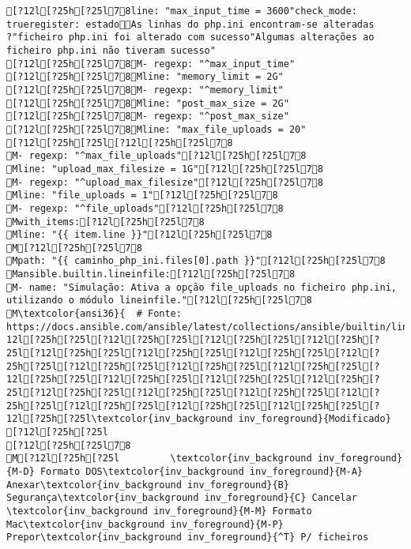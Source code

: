 \documentclass{scrartcl}
\begin{document}
\begin{Verbatim}
[?12l[?25h[?25l78line: "max_input_time = 3600"check_mode: trueregister: estadoAs linhas do php.ini encontram-se alteradas ?"ficheiro php.ini foi alterado com sucesso"Algumas alterações ao ficheiro php.ini não tiveram sucesso"
[?12l[?25h[?25l78M- regexp: "^max_input_time"
[?12l[?25h[?25l78Mline: "memory_limit = 2G"
[?12l[?25h[?25l78M- regexp: "^memory_limit"
[?12l[?25h[?25l78Mline: "post_max_size = 2G"
[?12l[?25h[?25l78M- regexp: "^post_max_size"
[?12l[?25h[?25l78Mline: "max_file_uploads = 20"
[?12l[?25h[?25l[?12l[?25h[?25l78
M- regexp: "^max_file_uploads"[?12l[?25h[?25l78
Mline: "upload_max_filesize = 1G"[?12l[?25h[?25l78
M- regexp: "^upload_max_filesize"[?12l[?25h[?25l78
Mline: "file_uploads = 1"[?12l[?25h[?25l78
M- regexp: "^file_uploads"[?12l[?25h[?25l78
Mwith_items:[?12l[?25h[?25l78
Mline: "{{ item.line }}"[?12l[?25h[?25l78
M[?12l[?25h[?25l78
Mpath: "{{ caminho_php_ini.files[0].path }}"[?12l[?25h[?25l78
Mansible.builtin.lineinfile:[?12l[?25h[?25l78
M- name: "Simulação: Ativa a opção file_uploads no ficheiro php.ini, utilizando o módulo lineinfile."[?12l[?25h[?25l78
M\textcolor{ansi36}{  # Fonte: https://docs.ansible.com/ansible/latest/collections/ansible/builtin/lineinfile_module.html}[?12l[?25h[?25l[?12l[?25h[?25l[?12l[?25h[?25l[?12l[?25h[?25l[?12l[?25h[?25l[?12l[?25h[?25l[?12l[?25h[?25l[?12l[?25h[?25l[?12l[?25h[?25l[?12l[?25h[?25l[?12l[?25h[?25l[?12l[?25h[?25l[?12l[?25h[?25l[?12l[?25h[?25l[?12l[?25h[?25l[?12l[?25h[?25l[?12l[?25h[?25l[?12l[?25h[?25l[?12l[?25h[?25l[?12l[?25h[?25l[?12l[?25h[?25l[?12l[?25h[?25l[?12l[?25h[?25l\textcolor{inv_background inv_foreground}{Modificado}
[?12l[?25h[?25l
[?12l[?25h[?25l78
M[?12l[?25h[?25l         \textcolor{inv_background inv_foreground}{M-D} Formato DOS\textcolor{inv_background inv_foreground}{M-A} Anexar\textcolor{inv_background inv_foreground}{B} Segurança\textcolor{inv_background inv_foreground}{C} Cancelar           \textcolor{inv_background inv_foreground}{M-M} Formato Mac\textcolor{inv_background inv_foreground}{M-P} Prepor\textcolor{inv_background inv_foreground}{^T} P/ ficheiros

\end{Verbatim}
\end{document}
